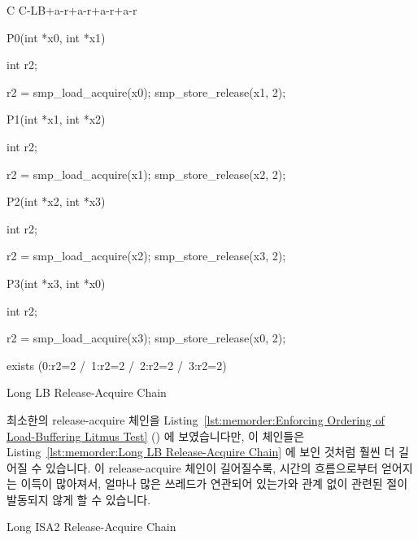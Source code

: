 \begin{listing}[tbp]
{ \scriptsize
\begin{verbbox}[\LstLineNo]
C C-LB+a-r+a-r+a-r+a-r
{
}

P0(int *x0, int *x1)
{
  int r2;

  r2 = smp_load_acquire(x0);
  smp_store_release(x1, 2);
}


P1(int *x1, int *x2)
{
  int r2;

  r2 = smp_load_acquire(x1);
  smp_store_release(x2, 2);
}

P2(int *x2, int *x3)
{
  int r2;

  r2 = smp_load_acquire(x2);
  smp_store_release(x3, 2);
}

P3(int *x3, int *x0)
{
  int r2;

  r2 = smp_load_acquire(x3);
  smp_store_release(x0, 2);
}

exists (0:r2=2 /\ 1:r2=2 /\ 2:r2=2 /\ 3:r2=2)
\end{verbbox}
}
\centering
\theverbbox
\caption{Long LB Release-Acquire Chain}
\label{lst:memorder:Long LB Release-Acquire Chain}
\end{listing}

최소한의 release-acquire 체인을
Listing~\ref{lst:memorder:Enforcing Ordering of Load-Buffering Litmus Test}
()
에 보였습니다만, 이 체인들은
Listing~\ref{lst:memorder:Long LB Release-Acquire Chain}
에 보인 것처럼 훨씬 더 길어질 수 있습니다.
이 release-acquire 체인이 길어질수록, 시간의 흐름으로부터 얻어지는 이득이
많아져서, 얼마나 많은 쓰레드가 연관되어 있는가와 관계 없이 관련된 
절이 발동되지 않게 할 수 있습니다.

\begin{listing}[tbp]

\caption{Long ISA2 Release-Acquire Chain}
\label{lst:memorder:Long ISA2 Release-Acquire Chain}
\end{listing}

